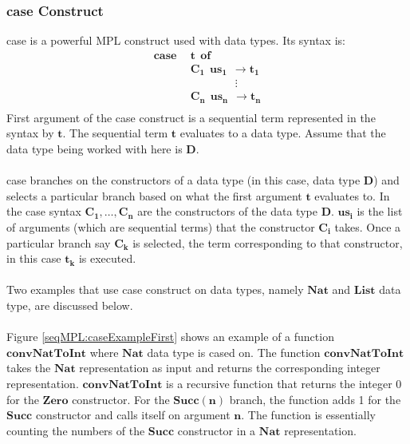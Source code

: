 \documentclass[11pt]{article}
\begin{document}
\subsubsection {case Construct}\label{SeqMPL:caseConstruct}
{\sf case} is a powerful MPL construct used with data types. Its syntax is:
\begin{align*}
      \mathbf{case~~}&\mathbf{t~~ of}\\
      &\mathbf{C_1~~us_1~~\to t_1} \\
      &\mathbf{\qquad\qquad \vdots} \\
      &\mathbf{C_n~~us_n~~\to t_n}\\
\end{align*}
First argument of the {\sf case} construct is a sequential term represented in the syntax by $\mathbf {t}$. The sequential term $\mathbf {t}$ evaluates to a data type. Assume that the data type being worked with here is $\mathbf{D}$.
~~\\~~\\
{\sf case} branches on the constructors of a data type (in this case, data type $\mathbf {D}$) and selects a particular branch based on what the first argument $\mathbf {t}$ evaluates to. In the {\sf case} syntax $\mathbf{C_1,\ldots,C_n}$ are the constructors of the data type $\mathbf {D}$. $\mathbf {us_i}$ is the list of arguments (which are sequential terms) that the constructor $\mathbf {C_i}$ takes. Once a particular branch say $\mathbf {C_k}$ is selected, the term corresponding to that constructor, in this case $\mathbf {t_k}$ is executed.
~~\\~~\\
Two examples that use {\sf case} construct on data types, namely $\mathbf {Nat}$ and $\mathbf {List}$ data type, are discussed below.
~~\\~~\\ 
Figure \ref{seqMPL:caseExampleFirst} shows an example of a function $\mathbf{convNatToInt}$ where $\mathbf{Nat}$ data type is cased on. The function $\mathbf{convNatToInt}$ takes the $\mathbf{Nat}$ representation as input and returns the corresponding integer representation. $\mathbf{convNatToInt}$ is a recursive function that returns the integer 0 for the  $\mathbf{Zero}$ constructor. For the $\mathbf{Succ(n)}$ branch, the function adds 1 for the  $\mathbf{Succ}$ constructor and calls itself on argument $\mathbf{n}$. The function is essentially counting the numbers of the $\mathbf{Succ}$ constructor in a $\mathbf{Nat}$ representation.
~~\\~~\\
\end{document}
